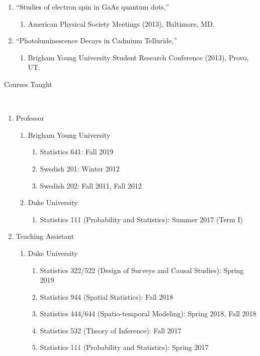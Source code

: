 \documentclass[12pt]{article}
\newcommand{\head}[1]{ %
    \bigskip %
    \begin{large}\begin{bf}{#1}\end{bf}\end{large} %

    \ \\ [-1.3cm] %

    \hrulefill}
\begin{document}
\begin{enumerate}[label=$\bullet$]
\begin{enumerate}[label=$\cdot$]
\end{enumerate}
\item  ``Studies of electron spin in GaAs quantum dots,''
\begin{enumerate}[label=$\cdot$]
\item  American Physical Society Meetings (2013), Baltimore, MD.
\end{enumerate}
\item  ``Photoluminescence Decays in Cadmium Telluride,'' 
\begin{enumerate}[label=$\cdot$]
\item Brigham Young University Student Research Conference (2013), Provo, UT.
\end{enumerate}
\end{enumerate}

\head{Courses Taught}

\begin{enumerate}[label=$\bullet$]
\item Professor
\begin{enumerate}[label=$\cdot$]
\item Brigham Young University
\begin{enumerate}[label=$\cdot$]
\item Statistics 641: Fall 2019
\item Swedish 201: Winter 2012 
\item Swedish 202: Fall 2011, Fall 2012
\end{enumerate}
\item Duke University
\begin{enumerate}[label=$\cdot$]
\item Statistics 111 (Probability and Statistics): Summer 2017 (Term I)
\end{enumerate}
\end{enumerate}
\item Teaching Assistant
\begin{enumerate}[label=$\cdot$]
\item Duke University
\begin{enumerate}[label=$\cdot$]
\item Statistics 322/522 (Design of Surveys and Causal Studies): Spring 2019
\item Statistics 944 (Spatial Statistics): Fall 2018
\item Statistics 444/644 (Spatio-temporal Modeling): Spring 2018, Fall 2018
\item Statistics 532 (Theory of Inference): Fall 2017
\item Statistics 111 (Probability and Statistics): Spring 2017 
\end{enumerate}
\end{enumerate}
\end{enumerate}
\end{document}
